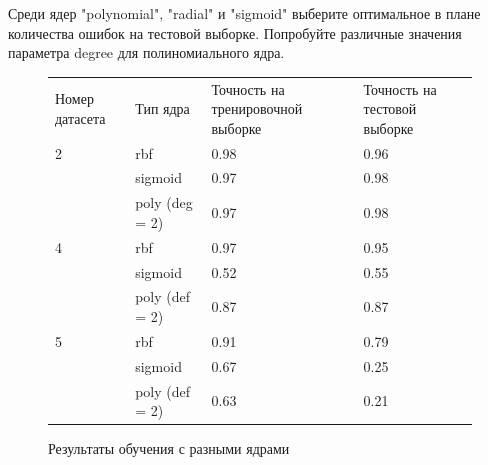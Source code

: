 \documentclass[a4paper,14pt]{article}
\begin{document}
Среди ядер "polynomial", "radial" и "sigmoid" выберите оптимальное в плане количества ошибок на тестовой выборке. Попробуйте различные значения параметра degree для полиномиального ядра.

\begin{figure}[H]

\resizebox{\columnwidth}{!}
{
\begin{tabular}{l l l l}
Номер датасета & Тип ядра & Точность на тренировочной выборке & Точность на тестовой выборке\\
2 & rbf & 0.98 & 0.96 \\
 & sigmoid & 0.97 & 0.98  \\
 & poly (deg = 2) & 0.97 & 0.98 \\
4 & rbf & 0.97 & 0.95 \\
 & sigmoid & 0.52 & 0.55 \\
 & poly (def = 2) & 0.87 & 0.87 \\
5 & rbf & 0.91 & 0.79 \\
 & sigmoid & 0.67 & 0.25 \\
 & poly (def = 2) & 0.63 & 0.21 \\  
\end{tabular}
}
\caption{Результаты обучения с разными ядрами}
\label{tbl:kernels}
\end{figure}
\end{document}

